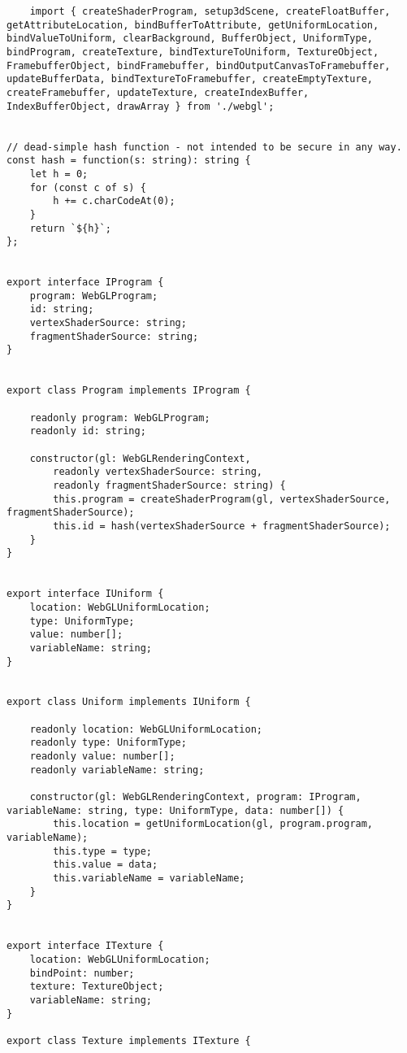 \begin{lstlisting}
    import { createShaderProgram, setup3dScene, createFloatBuffer, getAttributeLocation, bindBufferToAttribute, getUniformLocation, bindValueToUniform, clearBackground, BufferObject, UniformType, bindProgram, createTexture, bindTextureToUniform, TextureObject, FramebufferObject, bindFramebuffer, bindOutputCanvasToFramebuffer, updateBufferData, bindTextureToFramebuffer, createEmptyTexture, createFramebuffer, updateTexture, createIndexBuffer, IndexBufferObject, drawArray } from './webgl';


// dead-simple hash function - not intended to be secure in any way.
const hash = function(s: string): string {
    let h = 0;
    for (const c of s) {
        h += c.charCodeAt(0);
    }
    return `${h}`;
};


export interface IProgram {
    program: WebGLProgram;
    id: string;
    vertexShaderSource: string;
    fragmentShaderSource: string;
}


export class Program implements IProgram {

    readonly program: WebGLProgram;
    readonly id: string;

    constructor(gl: WebGLRenderingContext,
        readonly vertexShaderSource: string,
        readonly fragmentShaderSource: string) {
        this.program = createShaderProgram(gl, vertexShaderSource, fragmentShaderSource);
        this.id = hash(vertexShaderSource + fragmentShaderSource);
    }
}


export interface IUniform {
    location: WebGLUniformLocation;
    type: UniformType;
    value: number[];
    variableName: string;
}


export class Uniform implements IUniform {

    readonly location: WebGLUniformLocation;
    readonly type: UniformType;
    readonly value: number[];
    readonly variableName: string;

    constructor(gl: WebGLRenderingContext, program: IProgram, variableName: string, type: UniformType, data: number[]) {
        this.location = getUniformLocation(gl, program.program, variableName);
        this.type = type;
        this.value = data;
        this.variableName = variableName;
    }
}


export interface ITexture {
    location: WebGLUniformLocation;
    bindPoint: number;
    texture: TextureObject;
    variableName: string;
}

export class Texture implements ITexture {


\end{lstlisting}
